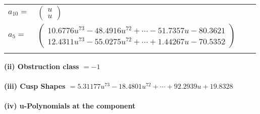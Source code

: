 \documentclass[1p]{elsarticle_modified}
\theoremstyle{definition}
\begin{document}
\begin{tabular}{m{7pt} m{180pt} m{7pt} m{180pt} }
\flushright $a_{10}=$&$\begin{pmatrix}u\\u\end{pmatrix}$ \\
\flushright $a_{5}=$&$\begin{pmatrix}10.6776 u^{73}-48.4916 u^{72}+\cdots-51.7357 u-80.3621\\12.4311 u^{73}-55.0275 u^{72}+\cdots+1.44267 u-70.5352\end{pmatrix}$\\&\end{tabular}
\flushleft \textbf{(ii) Obstruction class $= -1$}\\~\\
\flushleft \textbf{(iii) Cusp Shapes $= 5.31177 u^{73}-18.4801 u^{72}+\cdots+92.2939 u+19.8328$}\\~\\
\newpage\renewcommand{\arraystretch}{1}
\flushleft \textbf{(iv) u-Polynomials at the component}\newline \\
\end{document}
